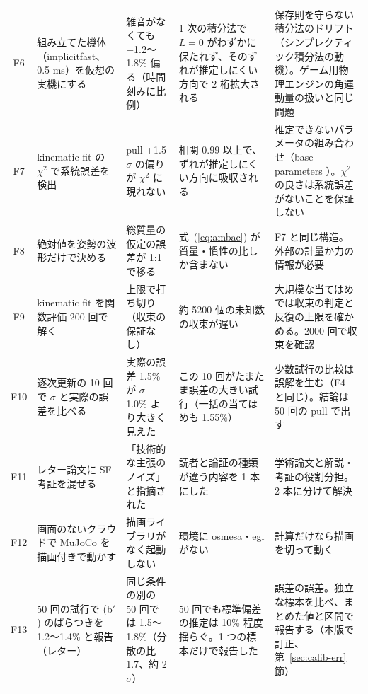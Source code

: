 \documentclass[paper=a4paper,fontsize=10pt,twocolumn,column_gap=2zw,line_length=24zw,number_of_lines=46,head_space=20mm]{jlreq}
\begin{document}
\begin{table}[t]
\begin{tabular}{cp{}p{}p{}p{}}
F6 & 組み立てた機体（implicitfast、0.5 ms）を仮想の実機にする & 雑音がなくても +1.2〜1.8\% 偏る（時間刻みに比例） & 1 次の積分法で $L=0$ がわずかに保たれず、そのずれが推定しにくい方向で 2 桁拡大される & 保存則を守らない積分法のドリフト（シンプレクティック積分法の動機）。ゲーム用物理エンジンの角運動量の扱いと同じ問題 \\
F7 & kinematic fit の $\chi^2$ で系統誤差を検出 & pull +1.5$\sigma$ の偏りが $\chi^2$ に現れない & 相関 0.99 以上で、ずれが推定しにくい方向に吸収される & 推定できないパラメータの組み合わせ（base parameters \cite{gautier1990}）。$\chi^2$ の良さは系統誤差がないことを保証しない \\
F8 & 絶対値を姿勢の波形だけで決める & 総質量の仮定の誤差が 1:1 で移る & 式~(\ref{eq:ambac}) が質量・慣性の比しか含まない & F7 と同じ構造。外部の計量か力の情報が必要 \\
F9 & kinematic fit を関数評価 200 回で解く & 上限で打ち切り（収束の保証なし） & 約 5200 個の未知数の収束が遅い & 大規模な当てはめでは収束の判定と反復の上限を確かめる。2000 回で収束を確認 \\
F10 & 逐次更新の 10 回で $\sigma$ と実際の誤差を比べる & 実際の誤差 1.5\% が $\sigma$ 1.0\% より大きく見えた & この 10 回がたまたま誤差の大きい試行（一括の当てはめも 1.55\%） & 少数試行の比較は誤解を生む（F4 と同じ）。結論は 50 回の pull で出す \\
F11 & レター論文に SF 考証を混ぜる & 「技術的な主張のノイズ」と指摘された & 読者と論証の種類が違う内容を 1 本にした & 学術論文と解説・考証の役割分担。2 本に分けて解決 \\
F12 & 画面のないクラウドで MuJoCo を描画付きで動かす & 描画ライブラリがなく起動しない & 環境に osmesa・egl がない & 計算だけなら描画を切って動く \\
F13 & 50 回の試行で (b$'$) のばらつきを 1.2〜1.4\% と報告（レター） & 同じ条件の別の 50 回では 1.5〜1.8\%（分散の比 1.7、約 2$\sigma$） & 50 回でも標準偏差の推定は 10\% 程度揺らぐ。1 つの標本だけで報告した & 誤差の誤差。独立な標本を比べ、まとめた値と区間で報告する（本版で訂正、第~\ref{sec:calib-err} 節） \\\bottomrule
\end{tabular}
\end{table}
\end{document}
